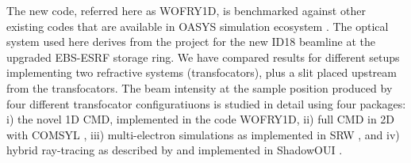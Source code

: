 \documentclass{iucr}              %
\begin{document}
The new code, referred here as WOFRY1D, is benchmarked against other existing codes that are available in OASYS simulation ecosystem \cite{codeOASYS}. The optical system used here derives from the project for the new ID18 beamline at the upgraded EBS-ESRF storage ring. We have compared results for different setups implementing two refractive systems (transfocators), plus a slit placed upstream from the transfocators. The beam intensity at the sample position produced by four different transfocator configuratiuons is studied in detail using four packages: i) the novel 1D CMD, implemented in the code WOFRY1D, ii) full CMD in 2D with COMSYL \cite{codeCOMSYL}, iii) multi-electron simulations as implemented in SRW \cite{codeSRW}, and iv) hybrid ray-tracing as described by  and implemented in ShadowOUI \cite{codeSHADOWOUI}.




\end{document}
